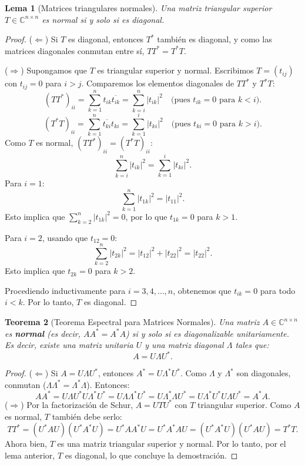 \documentclass[a4paper,11pt]{report}
\newtheorem{theorem}{Teorema}[chapter]
\newtheorem{lemma}[theorem]{Lema}
\begin{document}
\begin{lemma}[Matrices triangulares normales]
Una matriz triangular superior $T \in \mathbb{C}^{n \times n}$ es normal si y solo si es diagonal.
\end{lemma}

\begin{proof}
($\Leftarrow$) Si $T$ es diagonal, entonces $T^*$ también es diagonal, y como las matrices diagonales conmutan entre sí, $TT^* = T^*T$.

($\Rightarrow$) Supongamos que $T$ es triangular superior y normal. Escribimos $T = (t_{ij})$ con $t_{ij} = 0$ para $i > j$.
Comparemos los elementos diagonales de $TT^*$ y $T^*T$:
\[
(TT^*)_{ii} = \sum_{k=1}^n t_{ik} \overline{t_{ik}} = \sum_{k=i}^n |t_{ik}|^2 \quad \text{(pues $t_{ik}=0$ para $k<i$)}.
\]
\[
(T^*T)_{ii} = \sum_{k=1}^n \overline{t_{ki}} t_{ki} = \sum_{k=1}^i |t_{ki}|^2 \quad \text{(pues $t_{ki}=0$ para $k>i$)}.
\]
Como $T$ es normal, $(TT^*)_{ii} = (T^*T)_{ii}$:
\[
\sum_{k=i}^n |t_{ik}|^2 = \sum_{k=1}^i |t_{ki}|^2.
\]
Para $i=1$:
\[
\sum_{k=1}^n |t_{1k}|^2 = |t_{11}|^2.
\]
Esto implica que $\sum_{k=2}^n |t_{1k}|^2 = 0$, por lo que $t_{1k} = 0$ para $k > 1$.

Para $i=2$, usando que $t_{12}=0$:
\[
\sum_{k=2}^n |t_{2k}|^2 = |t_{12}|^2 + |t_{22}|^2 = |t_{22}|^2.
\]
Esto implica que $t_{2k} = 0$ para $k > 2$.

Procediendo inductivamente para $i = 3, 4, \ldots, n$, obtenemos que $t_{ik} = 0$ para todo $i < k$. Por lo tanto, $T$ es diagonal.
\end{proof}

\begin{theorem}[Teorema Espectral para Matrices Normales]
Una matriz $A \in \mathbb{C}^{n \times n}$ es \textbf{normal} (es decir, $A A^* = A^* A$) si y solo si es diagonalizable unitariamente. Es decir, existe una matriz unitaria $U$ y una matriz diagonal $\Lambda$ tales que:
\[
A = U \Lambda U^*.
\]
\end{theorem}

\begin{proof}
($\Leftarrow$) Si $A = U \Lambda U^*$, entonces $A^* = U \Lambda^* U^*$. Como $\Lambda$ y $\Lambda^*$ son diagonales, conmutan ($\Lambda \Lambda^* = \Lambda^* \Lambda$). Entonces:
\[
A A^* = U \Lambda U^* U \Lambda^* U^* = U \Lambda \Lambda^* U^* = U \Lambda^* \Lambda U^* = U \Lambda^* U^* U \Lambda U^* = A^* A.
\]
($\Rightarrow$) Por la factorización de Schur, $A = U T U^*$ con $T$ triangular superior. Como $A$ es normal, $T$ también debe serlo:
\[
T T^* = (U^* A U) (U^* A^* U) = U^* A A^* U = U^* A^* A U = (U^* A^* U) (U^* A U) = T^* T.
\]
Ahora bien, $T$ es una matriz triangular superior y normal. Por lo tanto, por el lema anterior, $T$ es diagonal, lo que concluye la demostración.
\end{proof}
\end{document}

